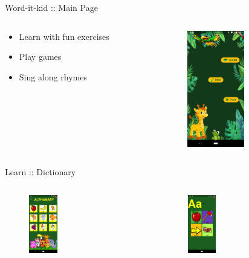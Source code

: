 \documentclass[14pt]{beamer}
\begin{document}
\begin{frame}{Word-it-kid :: Main Page}
    \begin{columns}
    \begin{column}{0.4\textwidth}
        \begin{itemize}
            \item Learn with fun exercises \\
            \item Play games \\
            \item Sing along rhymes
        \end{itemize}
    \end{column}
    \begin{column}{0.6\textwidth}
        \begin{figure}[ht]
            \includegraphics[height=2in]{Redirect.jpeg}
        \end{figure}
    \end{column}
    \end{columns}
\end{frame}

\begin{frame}{Learn :: Dictionary}
    \begin{columns}
    \begin{column}{0.5\textwidth}
        \begin{figure}[ht]
        \includegraphics[height=1in]{Dictionary.jpeg}
        \end{figure}
    \end{column}
    \begin{column}{0.5\textwidth}
        \begin{figure}[ht]
        \includegraphics[height=1in]{ElementDictionary.jpeg}
        \end{figure}
    \end{column}
    \end{columns}
\end{frame}
\end{document}
